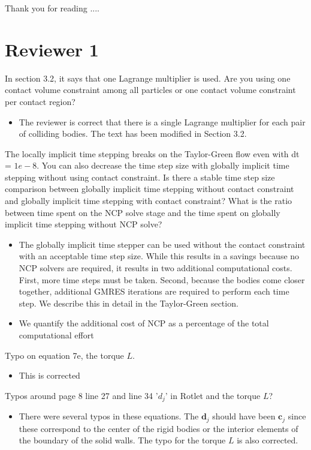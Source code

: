 \documentclass[11pt]{article}
\newcommand{\comment}[1]{{\color{blue} #1}}
\begin{document}
Thank you for reading ....

\section*{Reviewer 1}
\noindent
\comment{In section 3.2, it says that one Lagrange multiplier is used.
Are you using one contact volume constraint among all particles or one
contact volume constraint per contact region?}
\begin{itemize}
  \item The reviewer is correct that there is a single Lagrange
    multiplier for each pair of colliding bodies.  The text has been
    modified in Section 3.2.
\end{itemize}

\noindent
\comment{The locally implicit time stepping breaks on the Taylor-Green
  flow even with dt = $1e-8$. You can also decrease the time step size
  with globally implicit time stepping without using contact constraint.
  Is there a stable time step size comparison between globally implicit
  time stepping without contact constraint and globally implicit time
  stepping with contact constraint? What is the ratio between time spent
  on the NCP solve stage and the time spent on globally implicit time
  stepping without NCP solve?}
\begin{itemize}
  \item The globally implicit time stepper can be used without the
    contact constraint with an acceptable time step size.  While this
    results in a savings because no NCP solvers are required, it results
    in two additional computational costs.  First, more time steps must
    be taken.  Second, because the bodies come closer together,
    additional GMRES iterations are required to perform each time step.
    We describe this in detail in the Taylor-Green section.

  \item We quantify the additional cost of NCP as a percentage of the
    total computational effort
\end{itemize}

\noindent
\comment{Typo on equation 7e, the torque $L$.}
\begin{itemize}
  \item This is corrected
\end{itemize}

\noindent
\comment{Typos around page 8 line 27 and line 34 '$d_j$' in Rotlet and the
torque $L$?}
\begin{itemize}
  \item There were several typos in these equations.  The $\mathbf{d}_j$
    should have been $\mathbf{c}_j$ since these correspond to the center
    of the rigid bodies or the interior elements of the boundary of the
    solid walls.  The typo for the torque $L$ is also corrected.
\end{itemize}
\end{document}
